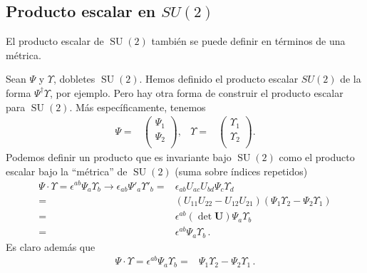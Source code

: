 \subsection{Producto escalar en $SU(2)$}
El producto escalar de $\operatorname{SU}(2)$ también se puede definir en términos de una métrica.

\begin{frame}
  Sean $\Psi$ y $\Upsilon$, dobletes $\operatorname{SU}(2)$. Hemos definido el producto escalar $SU(2)$ de la forma $\Psi^{\dagger}\Upsilon$, por ejemplo. Pero hay otra forma de construir el producto escalar para $\operatorname{SU}(2)$. Más específicamente, tenemos
\begin{align}
  \Psi=&
  \begin{pmatrix}
    \Psi_1\\
    \Psi_2\\
  \end{pmatrix},&
  \Upsilon=&
  \begin{pmatrix}
    \Upsilon_1\\
    \Upsilon_2\\
  \end{pmatrix}.
\end{align}
Podemos definir un producto que es invariante bajo $\operatorname{SU}(2)$ como el producto escalar bajo la ``métrica'' de $\operatorname{SU}(2)$ (suma sobre índices repetidos)
\begin{align}
\Psi\cdot\Upsilon=\epsilon^{ab}\Psi_a \Upsilon_b\to \epsilon_{ab}\Psi'_a \Upsilon'_b=&\epsilon_{ab}U_{ac}U_{bd}\Psi_c \Upsilon_d\nonumber\\
  =&\left( U_{11}U_{22}-U_{12}U_{21} \right)\left(\Psi_1\Upsilon_2-\Psi_2\Upsilon_1  \right)\nonumber\\
  =&\epsilon^{ab}\left( \det\mathbf{U} \right) \Psi_a \Upsilon_b\nonumber\\
  =&\epsilon^{ab} \Psi_a \Upsilon_b\,.
\end{align}
Es claro además que
\begin{align}
 \Psi\cdot\Upsilon= \epsilon^{ab}\Psi_a \Upsilon_b=&\Psi_1 \Upsilon_2-\Psi_2 \Upsilon_1 \,.
 \end{align}



\end{frame}
